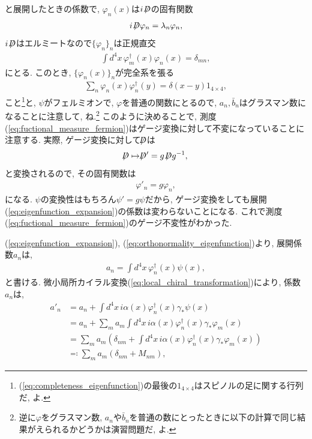 \documentclass{ltjsarticle}
\theoremstyle{definition}
\def\slash#1{\!\!\not\!\!#1}
\def\dsla{\,\slash{D}}
\begin{document}
と展開したときの係数で, $\varphi_n(x)$は$i\dsla$の固有関数
\begin{gather}
  i\dsla\varphi_n=\lambda_n\varphi_n,
\end{gather}
$i\dsla$はエルミートなので$\{\varphi_n\}_n$は正規直交
\begin{gather}
  \int d^4x\,\varphi^\dagger_m(x)\varphi_n(x)=\delta_{mn},\label{eq:orthonormality_eigenfunction}
\end{gather}
にとる. このとき, $\{\varphi_n(x)\}_n$が完全系を張る
\begin{gather}
  \sum_n\varphi_n(x)\varphi_n^\dagger(y)=\delta(x-y)1_{4\times4},\label{eq:completeness_eigenfunction}
\end{gather}
こと\footnote{(\ref{eq:completeness_eigenfunction})の最後の$1_{4\times4}$はスピノルの足に関する行列だ, よ.}と, $\psi$がフェルミオンで, $\varphi$を普通の関数にとるので, $a_n,\bar b_n$はグラスマン数になることに注意して, ね.\footnote{逆に$\varphi$をグラスマン数, $a_n$や$\bar b_n$を普通の数にとったときに以下の計算で同じ結果がえられるかどうかは演習問題だ, よ.} このように決めることで, 測度(\ref{eq:fuctional_measure_fermion})はゲージ変換に対して不変になっていることに注意する. 実際, ゲージ変換に対して$\dsla$は
\begin{gather}
  \dsla\mapsto\,\dsla'=g\dsla g^{-1},
\end{gather}
と変換されるので, その固有関数は
\begin{gather}
  \varphi'_n=g\varphi_n,
\end{gather}
になる. $\psi$の変換性はもちろん$\psi'=g\psi$だから, ゲージ変換をしても展開(\ref{eq:eigenfunction_expansion})の係数は変わらないことになる. これで測度(\ref{eq:fuctional_measure_fermion})のゲージ不変性がわかった.\par
(\ref{eq:eigenfunction_expansion}), (\ref{eq:orthonormality_eigenfunction})より, 展開係数$a_n$は,
\begin{gather}
  a_n=\int d^4x\,\varphi^\dagger_n(x)\psi(x),
\end{gather}
と書ける. 微小局所カイラル変換(\ref{eq:local_chiral_transformation})により, 係数$a_n$は,
\begin{align}
  a'_n&=a_n+\int d^4x\,i\alpha(x)\varphi_n^\dagger(x)\gamma_\ast\psi(x)\\
  &=a_n+\sum_ma_m\int d^4x\,i\alpha(x)\varphi_n^\dagger(x)\gamma_\ast\varphi_m(x)\\
  &=\sum_ma_m\left(\delta_{nm}+\int d^4x\,i\alpha(x)\varphi_n^\dagger(x)\gamma_\ast\varphi_m(x)\right)\\
  &\eqqcolon\sum_ma_m\left(\delta_{nm}+M_{nm}\right),
\end{align}
\end{document}
